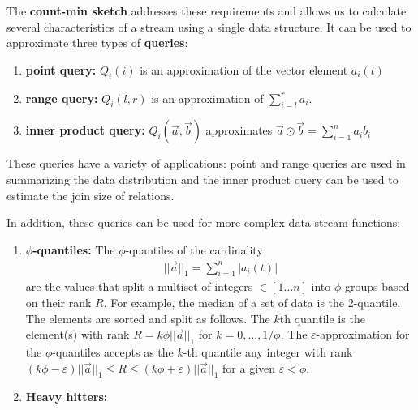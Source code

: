 \documentclass[11pt]{article}
\newcommand{\sq}{\mathit{Q}_i}
\begin{document}
The \textbf{count-min sketch} addresses these requirements and allows us to calculate several characteristics
of a stream using a single data structure.  It can be used to approximate three types of \textbf{queries}:
\begin{enumerate}
    \item \textbf{point query:} $\sq(i)$ is an approximation of the vector 
    element $a_i(t)$
    \item \textbf{range query:} $\sq(l, r)$ is an approximation of 
    $\sum_{i = l}^{r}a_i$. 
    \item \textbf{inner product query:} $\sq(\vec{a}, \vec{b})$ approximates
    $\vec{a} \odot \vec{b} = \sum_{i = 1}^{n} a_i b_i$
\end{enumerate}

These queries have a variety of applications: point and range queries are used in summarizing
the data distribution and the inner product query can be used to estimate the join size of 
relations. 

In addition, these queries can be used for more complex data stream functions:

\begin{enumerate}
    \item \textbf{$\phi$-quantiles:} The $\phi$-quantiles of the cardinality
    \begin{align}
        ||\vec{a}||_1 = \sum_{i = 1}^{n}|a_i(t)|
    \end{align}
    are the values that split a multiset of integers $\in [1 \dots n]$ into $\phi$ groups based on
    their rank $R$.  For example, the median of a set of data is the 2-quantile. The elements are sorted and split as
    follows.  The $k$th quantile is the element(s) with rank $R = k\phi||\vec{a}||_1$ for $k = 0, \dots,
    1/\phi$.  The $\varepsilon$-approximation for the $\phi$-quantiles accepts as the $k$-th quantile
    any integer with rank $(k\phi - \varepsilon)||\vec{a}||_1 \leq R \leq (k\phi +
    \varepsilon)||\vec{a}||_1$ for a given $\varepsilon < \phi$.
    \item \textbf{Heavy hitters:}
\end{enumerate}
\end{document}
